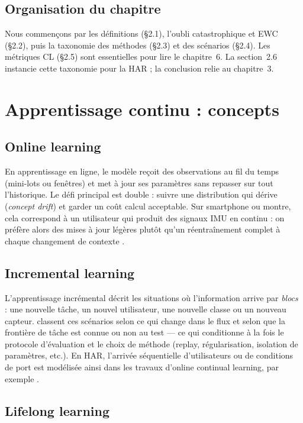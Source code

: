 \documentclass[a4paper,12pt]{report}
\begin{document}
\subsection{Organisation du chapitre}

Nous commençons par les définitions (§2.1), l'oubli catastrophique et EWC (§2.2),
puis la taxonomie des méthodes (§2.3) et des scénarios (§2.4). Les métriques
CL (§2.5) sont essentielles pour lire le chapitre~6. La section~2.6 instancie
cette taxonomie pour la HAR ; la conclusion relie au chapitre~3.

\section{Apprentissage continu : concepts}

\subsection{Online learning}

En apprentissage en ligne, le modèle reçoit des observations au fil du temps
(mini-lots ou fenêtres) et met à jour ses paramètres sans repasser sur tout
l'historique. Le défi principal est double : suivre une distribution qui
dérive (\emph{concept drift}) et garder un coût calcul acceptable. Sur
smartphone ou montre, cela correspond à un utilisateur qui produit des signaux
IMU en continu : on préfère alors des mises à jour légères plutôt qu'un
réentraînement complet à chaque changement de contexte
\parencite{mazankiewicz2020,amrani2025}.

\subsection{Incremental learning}

L'apprentissage incrémental décrit les situations où l'information arrive par
\emph{blocs} : une nouvelle tâche, un nouvel utilisateur, une nouvelle classe
ou un nouveau capteur. \textcite{vdven2022} classent ces scénarios selon ce
qui change dans le flux et selon que la frontière de tâche est connue ou non au
test — ce qui conditionne à la fois le protocole d'évaluation et le choix de
méthode (replay, régularisation, isolation de paramètres, etc.). En HAR,
l'arrivée séquentielle d'utilisateurs ou de conditions de port est modélisée
ainsi dans les travaux d'online continual learning, par exemple
\parencite{schiemer2023}.

\subsection{Lifelong learning}
\end{document}
